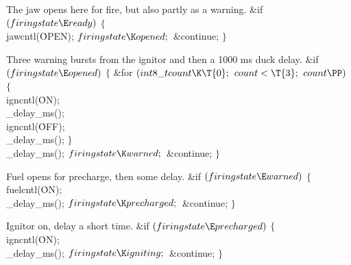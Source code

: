 The jaw opens here for fire, but also partly as a warning.
\Y\B\&{if} ${}(\\{firingstate}\E\\{ready}){}$\5
${}\{{}$\1\6
\\{jawcntl}(\.{OPEN});\6
${}\\{firingstate}\K\\{opened};{}$\6
\&{continue};\6
\4${}\}{}$\2\par
\fi

Three warning bursts from the ignitor and then a 1000 ms duck delay.
\Y\B\&{if} ${}(\\{firingstate}\E\\{opened}){}$\5
${}\{{}$\1\6
\&{for} ${}(\\{int8\_t}\\{count}\K\T{0};{}$ ${}\\{count}<\T{3};{}$ ${}\\{count}%
\PP){}$\5
${}\{{}$\1\6
\\{igncntl}(\.{ON});\6
\\{\_delay\_ms}();\6
\\{igncntl}(\.{OFF});\6
\\{\_delay\_ms}();\6
\4${}\}{}$\2\6
\\{\_delay\_ms}();\6
${}\\{firingstate}\K\\{warned};{}$\6
\&{continue};\6
\4${}\}{}$\2\par
\fi

Fuel opens for precharge, then some delay.
\Y\B\&{if} ${}(\\{firingstate}\E\\{warned}){}$\5
${}\{{}$\1\6
\\{fuelcntl}(\.{ON});\6
\\{\_delay\_ms}();\6
${}\\{firingstate}\K\\{precharged};{}$\6
\&{continue};\6
\4${}\}{}$\2\par
\fi

Ignitor on, delay a short time.
\Y\B\&{if} ${}(\\{firingstate}\E\\{precharged}){}$\5
${}\{{}$\1\6
\\{igncntl}(\.{ON});\6
\\{\_delay\_ms}();\6
${}\\{firingstate}\K\\{igniting};{}$\6
\&{continue};\6
\4${}\}{}$\2\par
\fi

